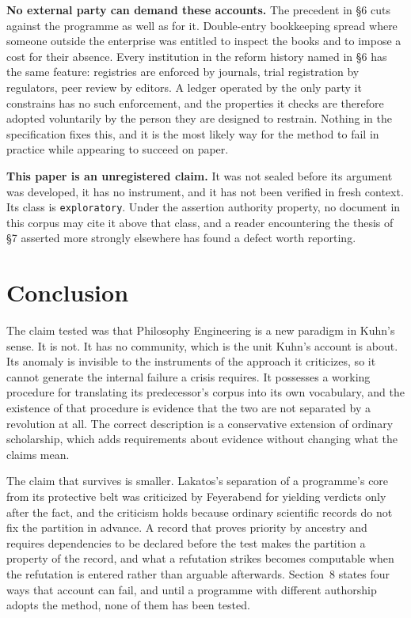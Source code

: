 \documentclass[11pt,letterpaper]{article}
\begin{document}
\textbf{No external party can demand these accounts.} The precedent in \S6 cuts
against the programme as well as for it. Double-entry bookkeeping spread where
someone outside the enterprise was entitled to inspect the books and to impose a
cost for their absence. Every institution in the reform history named in \S6 has
the same feature: registries are enforced by journals, trial registration by
regulators, peer review by editors. A ledger operated by the only party it
constrains has no such enforcement, and the properties it checks are therefore
adopted voluntarily by the person they are designed to restrain. Nothing in the
specification fixes this, and it is the most likely way for the method to fail in
practice while appearing to succeed on paper.

\textbf{This paper is an unregistered claim.} It was not sealed before its
argument was developed, it has no instrument, and it has not been verified in
fresh context. Its class is \texttt{exploratory}. Under the assertion authority
property, no document in this corpus may cite it above that class, and a reader
encountering the thesis of \S7 asserted more strongly elsewhere has found a
defect worth reporting.

\section{Conclusion}

The claim tested was that Philosophy Engineering is a new paradigm in Kuhn's
sense. It is not. It has no community, which is the unit Kuhn's account is about.
Its anomaly is invisible to the instruments of the approach it criticizes, so it
cannot generate the internal failure a crisis requires. It possesses a working
procedure for translating its predecessor's corpus into its own vocabulary, and
the existence of that procedure is evidence that the two are not separated by a
revolution at all. The correct description is a conservative extension of
ordinary scholarship, which adds requirements about evidence without changing
what the claims mean.

The claim that survives is smaller. Lakatos's separation of a programme's core
from its protective belt was criticized by Feyerabend for yielding verdicts only
after the fact, and the criticism holds because ordinary scientific records do
not fix the partition in advance. A record that proves priority by ancestry and
requires dependencies to be declared before the test makes the partition a
property of the record, and what a refutation strikes becomes computable when the
refutation is entered rather than arguable afterwards. Section~8 states four ways
that account can fail, and until a programme with different authorship adopts the
method, none of them has been tested.
\end{document}
